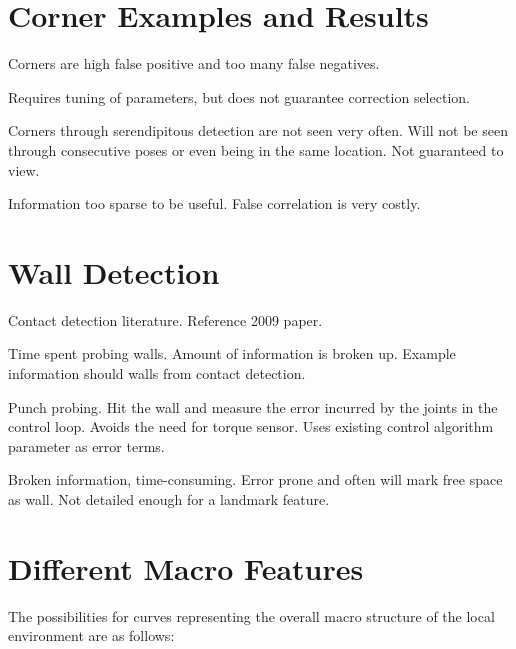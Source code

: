 \section{Corner Examples and Results}
\label{cornerexamplesandresults}

Corners are high false positive and too many false negatives.

Requires tuning of parameters, but does not guarantee correction selection.

Corners through serendipitous detection are not seen very often. Will not be seen through consecutive poses or even being in the same location. Not guaranteed to view.

Information too sparse to be useful. False correlation is very costly.

\section{Wall Detection}
\label{walldetection}

Contact detection literature. Reference 2009 paper.

Time spent probing walls. Amount of information is broken up. Example information should walls from contact detection.

Punch probing. Hit the wall and measure the error incurred by the joints in the control loop. Avoids the need for torque sensor. Uses existing control algorithm parameter as error terms.

Broken information, time-consuming. Error prone and often will mark free space as wall. Not detailed enough for a landmark feature.

\section{Different Macro Features}
\label{differentmacrofeatures}

The possibilities for curves representing the overall macro structure of the local environment are as follows:

